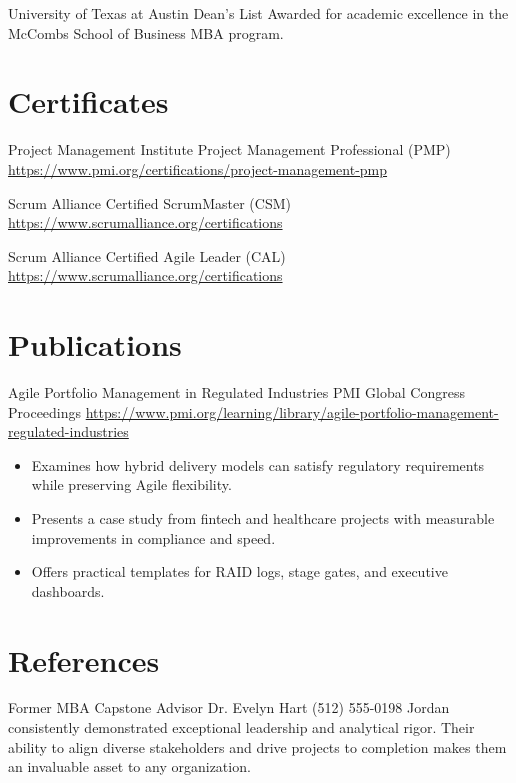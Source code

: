 \documentclass[a4paper, serif, 10pt]{moderncv}
\begin{document}
        {University of Texas at Austin}
        {Dean's List}
        {}
        {}
        {Awarded for academic excellence in the McCombs School of Business MBA program.}
\section{Certificates}

        {Project Management Institute}
        {Project Management Professional (PMP)}
        {\url{https://www.pmi.org/certifications/project-management-pmp}}
        {}
        {}

        {Scrum Alliance}
        {Certified ScrumMaster (CSM)}
        {\url{https://www.scrumalliance.org/certifications}}
        {}
        {}

        {Scrum Alliance}
        {Certified Agile Leader (CAL)}
        {\url{https://www.scrumalliance.org/certifications}}
        {}
        {}
\section{Publications}

        {Agile Portfolio Management in Regulated Industries}
        {PMI Global Congress Proceedings}
        {\url{https://www.pmi.org/learning/library/agile-portfolio-management-regulated-industries}}
        {}
        {\begin{itemize}
\item Examines how hybrid delivery models can satisfy regulatory requirements while preserving Agile flexibility.
\item Presents a case study from fintech and healthcare projects with measurable improvements in compliance and speed.
\item Offers practical templates for RAID logs, stage gates, and executive dashboards.
\end{itemize}}
\section{References}

        {Former MBA Capstone Advisor}
        {Dr. Evelyn Hart}
        {(512) 555-0198}
        {}
        {Jordan consistently demonstrated exceptional leadership and analytical rigor. Their ability to align diverse stakeholders and drive projects to completion makes them an invaluable asset to any organization.}
\end{document}
